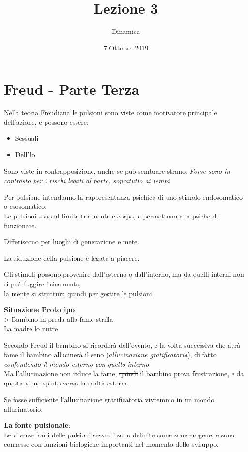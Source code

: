 \documentclass[
]{article}
\date{7 Ottobre 2019}
\title{Lezione 3}
\author{Dinamica}
\providecommand{\tightlist}{%
  \setlength{\itemsep}{0pt}\setlength{\parskip}{0pt}}
\begin{document}
\maketitle
\section{Freud - Parte Terza}

Nella teoria Freudiana le pulsioni sono viste come motivatore principale
dell'azione, e possono essere:

\begin{itemize}
\tightlist
\item
  Sessuali
\item
  Dell'Io
\end{itemize}

Sono viste in contrapposizione, anche se può sembrare strano.
\emph{Forse sono in contrasto per i rischi legati al parto, sopratutto
ai tempi}

Per pulsione intendiamo la rappresentanza psichica di uno stimolo
endosomatico o esosomatico.\\
Le pulsioni sono al limite tra mente e corpo, e permettono alla psiche
di funzionare.

Differiscono per luoghi di generazione e mete.

La riduzione della pulsione è legata a piacere.

Gli stimoli possono provenire dall'esterno o dall'interno, ma da quelli
interni non si può fuggire fisicamente,\\
la mente si struttura quindi per gestire le pulsioni

\textbf{Situazione Prototipo}\\
\textgreater{} Bambino in preda alla fame strilla\\
La madre lo nutre

Secondo Freud il bambino si ricorderà dell'evento, e la volta successiva
che avrà fame il bambino allucinerà il seno (\emph{allucinazione
gratificatoria}), di fatto \emph{confondendo il mondo esterno con quello
interno}.\\
Ma l'allucinazione non riduce la fame, \sout{quindi} il bambino prova
frustrazione, e da questa viene spinto verso la realtà esterna.

Se fosse sufficiente l'allucinazione gratificatoria vivremmo in un mondo
allucinatorio.

\textbf{La fonte pulsionale}:\\
Le diverse fonti delle pulsioni sessuali sono definite come zone
erogene, e sono connesse con funzioni biologiche importanti nel momento
dello sviluppo.
\end{document}
